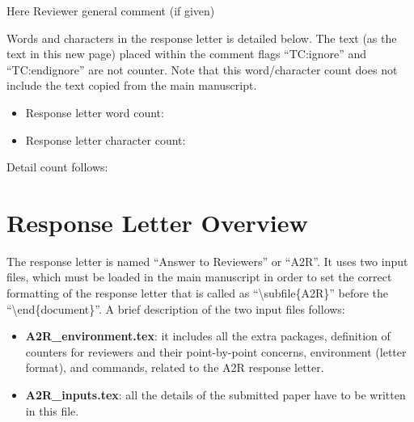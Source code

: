 \documentclass[./IEEE_Journal.tex]{subfiles}
\begin{document}
\reviewersection 
Here Reviewer general comment (if given) 



\newpage
Words and characters in the response letter is detailed below. 
The text (as the text in this new page) placed within the comment flags ``TC:ignore'' and ``TC:endignore'' are not counter.
Note that this word/character count does not include the text copied from the main manuscript.

\begin{itemize}
    \item Response letter word count: 
    \item Response letter character count: 
\end{itemize}

\par{Detail count follows:}












\section{Response Letter Overview}\label{sec:overview}
The response letter is named ``Answer to Reviewers'' or ``A2R''.
It uses two input files, which must be loaded in the main manuscript in order to set the correct formatting of the response letter that is called as ``\textbackslash subfile\{A2R\}'' before the ``\textbackslash end\{document\}''.
A brief description of the two input files follows:
\begin{itemize}
    \item \textbf{A2R\_environment.tex}: it includes all the extra packages, definition of counters for reviewers and their point-by-point concerns, environment (letter format), and commands, related to the A2R response letter.
    \item \textbf{A2R\_inputs.tex}: all the details of the submitted paper have to be written in this file. 
\end{itemize}
\end{document}

